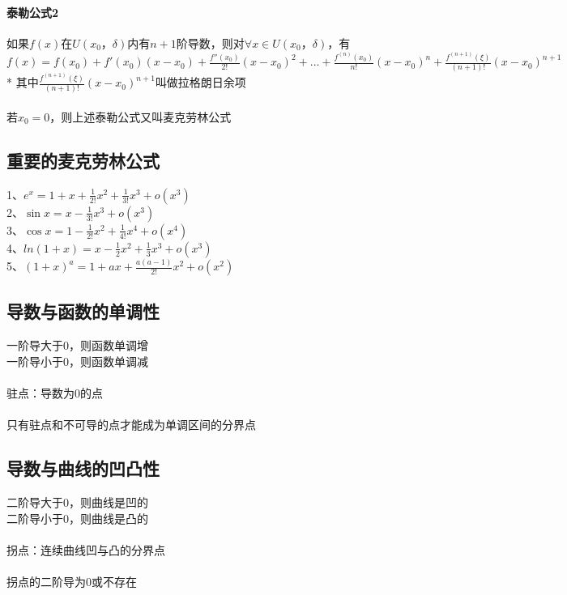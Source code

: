 \documentclass{article}
\begin{document}
\begin{flushleft}
	\paragraph{泰勒公式2}
	如果$f(x)$在$U(x_0，\delta)$内有$n+1$阶导数，则对$\forall x \in U(x_0，\delta)$，有$f(x)=f(x_0)+f'(x_0)(x-x_0)+\frac{f''(x_0)}{2!}(x-x_0)^2+...+\frac{f^{(n)}(x_0)}{n!}(x-x_0)^n+\frac{f^{(n+1)}(\xi)}{(n+1)!}(x-x_0)^{n+1}$\\
	* 其中$\frac{f^{(n+1)}(\xi)}{(n+1)!}(x-x_0)^{n+1}$叫做拉格朗日余项\\
	~\\
	若$x_0=0$，则上述泰勒公式又叫麦克劳林公式\\
	
	\subsection{重要的麦克劳林公式}
	
	1、$e^x=1+x+\frac{1}{2!}x^2+\frac{1}{3!}x^3+o(x^3)$\\
	2、$\sin x=x-\frac{1}{3!}x^3+o(x^3)$\\
	3、$\cos x=1-\frac{1}{2!}x^2+\frac{1}{4!}x^4+o(x^4)$\\
	4、$ln(1+x)=x-\frac{1}{2}x^2+\frac{1}{3}x^3+o(x^3)$\\
	5、$(1+x)^a=1+ax+\frac{a(a-1)}{2!}x^2+o(x^2)$\\
	
	\subsection{导数与函数的单调性}
	
	一阶导大于0，则函数单调增\\
	一阶导小于0，则函数单调减\\
	~\\
	驻点：导数为0的点\\
	~\\
	只有驻点和不可导的点才能成为单调区间的分界点\\
	
	\subsection{导数与曲线的凹凸性}
	
	二阶导大于0，则曲线是凹的\\
	二阶导小于0，则曲线是凸的\\
	~\\
	拐点：连续曲线凹与凸的分界点\\
	~\\
	拐点的二阶导为0或不存在\\
	~\\

\end{flushleft}
\end{document}
